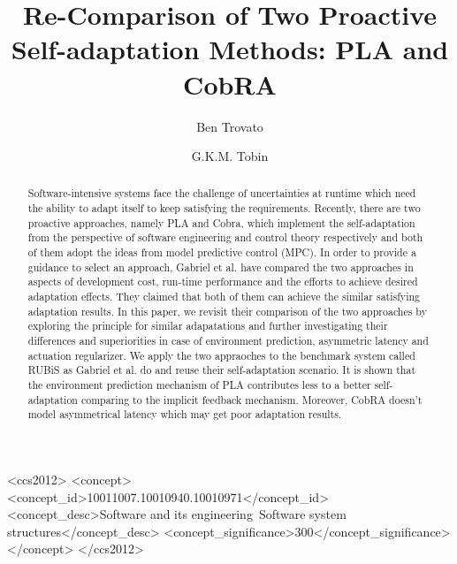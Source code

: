 \documentclass[sigconf]{acmart}
\begin{document}
\title{Re-Comparison of Two Proactive Self-adaptation Methods: PLA and CobRA}

\author{Ben Trovato}
\author{G.K.M. Tobin}
\authornotemark[1]

\author{}

\author{}
%
%

\begin{abstract}
Software-intensive systems face the challenge of uncertainties at runtime which need the ability to adapt itself to keep satisfying the requirements. Recently, there are two proactive approaches, namely PLA and Cobra, which implement the self-adaptation from the perspective of software engineering and control theory respectively and both of them adopt the ideas from model predictive control (MPC). In order to provide a guidance to select an approach, Gabriel et al. have compared the two approaches in aspects of development cost, run-time performance and the efforts to achieve desired adaptation effects. They claimed that both of them can achieve the similar satisfying adaptation results. In this paper, we revisit their comparison of the two approaches by exploring the principle for similar adapatations and further investigating their differences and superiorities in case of environment prediction, asymmetric latency and actuation regularizer. We apply the two appraoches to the benchmark system called RUBiS as Gabriel et al. do and reuse their self-adaptation scenario. It is shown that the environment prediction mechanism of PLA contributes less to a better self-adaptation comparing to the implicit feedback mechanism. Moreover, CobRA doesn't model asymmetrical latency which may get poor adaptation results.
\end{abstract}

\begin{CCSXML}
	<ccs2012>
	<concept>
	<concept_id>10011007.10010940.10010971</concept_id>
	<concept_desc>Software and its engineering~Software system structures</concept_desc>
	<concept_significance>300</concept_significance>
	</concept>
	</ccs2012>
\end{CCSXML}
\end{document}
